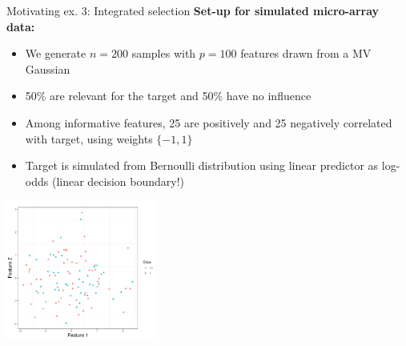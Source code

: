 \documentclass[11pt,compress,t,notes=noshow, xcolor=table]{beamer}
\begin{document}
\begin{vbframe}{Motivating ex. 3: Integrated selection}
\vspace{-0.15cm}
\textbf{Set-up for simulated micro-array data:}
\vspace{-0.1cm}
  \begin{itemize}\small
  \setlength{\itemsep}{0.7em}
  \item We generate $n=200$ samples with $p=100$ features drawn from a MV Gaussian
  \item 50\% are relevant for the target and 50\% have no influence
  \item Among informative features, 25 are positively and 25 negatively correlated with target,  using weights $\{-1,1\}$
  \item Target is simulated from Bernoulli distribution using linear predictor as log-odds (linear decision boundary!)
  \end{itemize}
  \vspace{-0.35cm}

  \begin{center} \includegraphics[width=0.37\textwidth]{figure/gene-data-points.pdf}
  \end{center}

  \framebreak


\end{vbframe}
\end{document}
